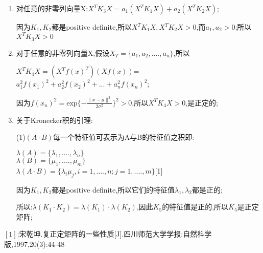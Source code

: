 \documentclass[11pt, a4paper, UTF8]{ctexart}
\begin{document}
\begin{solution}
\begin{enumerate}
	\item 对任意的非零列向量X:$X^TK_3X=a_1(X^TK_1X)+a_2(X^TK_2X)$;
	
	因为$K_1,K_2$都是positive definite,所以$X^TK_1X,X^TK_2X>0$,而$a_1,a_2>0$;所以$X^TK_3X>0$
	\item 对于任意的非零列向量X,假设$X_T=\{a_1,a_2,....,a_n\}$,所以
	
	$X^TK_4X=(X^Tf(x)^T)(Xf(x))$=$a_1^2f(x_1)^2+a_2^2f(x_2)^2+...+a_n^2f(x_n)^2$;
	
	因为$f(x_n)^2=\text{exp}\{-\frac{\|x-\mu\|^2}{2\sigma^2}\}^2>0$,所以$X^TK_4X>0$,是正定的;
	\item 关于Kronecker积的引理:
	
	(1)$(A\cdot B)$每一个特征值可表示为A与B的特征值之积即:
	
	$\lambda (A)=\{\lambda_1,....,\lambda_n\}$
	\\$\lambda (B)=\{\mu_1,....,\mu_m\}$
	\\$\lambda(A\cdot B)=\{\lambda_i\mu_j,i=1,....,n;j=1,....,m\}$[1]
	
	因为$K_1,K_2$都是positive definite,所以它们的特征值$\lambda_1,\lambda_2$都是正的;
	
	所以:$\lambda(K_1\cdot K_2)=\lambda(K_1)\cdot \lambda(K_2)$,因此$K_5$的特征值是正的,所以$K_5$是正定矩阵;
\end{enumerate}
    
\end{solution}
\begin{remark}
	$[1]$:宋乾坤.复正定矩阵的一些性质[J].四川师范大学学报:自然科学版,1997,20(3):44-48
\end{remark}
\end{document}
